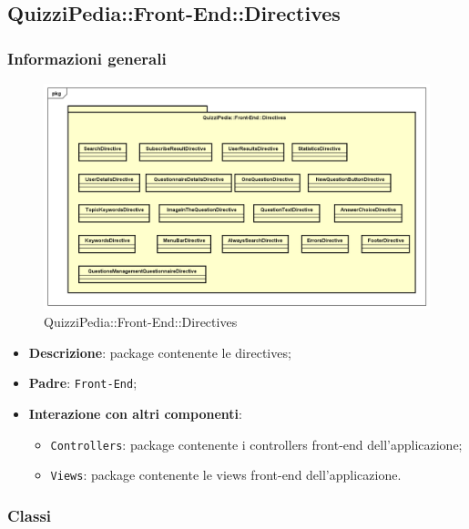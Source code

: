 \newpage

\subsection{QuizziPedia::Front-End::Directives}
\subsubsection{Informazioni generali}
\label{QuizziPedia::Front-End::Directives}
\begin{figure}
	\centering
	\includegraphics[scale=0.45]{UML/Package/QuizziPedia_Front-end_Directives.png}
	\caption{QuizziPedia::Front-End::Directives}
\end{figure}
\begin{itemize}
	\item \textbf{Descrizione}: package contenente le directives;
	\item \textbf{Padre}: \texttt{Front-End};
	\item \textbf{Interazione con altri componenti}:
	\begin{itemize}
		\item \texttt{Controllers}: package contenente i controllers front-end dell'applicazione;
		\item \texttt{Views}: package contenente le views front-end dell'applicazione.
	\end{itemize}
\end{itemize}
\subsubsection{Classi}
%

%